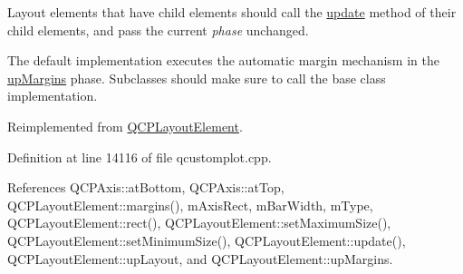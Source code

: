 Layout elements that have child elements should call the \hyperlink{class_q_c_p_color_scale_ab8f6991ac88243fc582b44b183670334}{update} method of their child elements, and pass the current {\itshape phase} unchanged.

The default implementation executes the automatic margin mechanism in the \hyperlink{class_q_c_p_layout_element_a0d83360e05735735aaf6d7983c56374da288cb59a92280e47261a341f2813e676}{up\+Margins} phase. Subclasses should make sure to call the base class implementation. 

Reimplemented from \hyperlink{class_q_c_p_layout_element_a929c2ec62e0e0e1d8418eaa802e2af9b}{Q\+C\+P\+Layout\+Element}.



Definition at line 14116 of file qcustomplot.\+cpp.



References Q\+C\+P\+Axis\+::at\+Bottom, Q\+C\+P\+Axis\+::at\+Top, Q\+C\+P\+Layout\+Element\+::margins(), m\+Axis\+Rect, m\+Bar\+Width, m\+Type, Q\+C\+P\+Layout\+Element\+::rect(), Q\+C\+P\+Layout\+Element\+::set\+Maximum\+Size(), Q\+C\+P\+Layout\+Element\+::set\+Minimum\+Size(), Q\+C\+P\+Layout\+Element\+::update(), Q\+C\+P\+Layout\+Element\+::up\+Layout, and Q\+C\+P\+Layout\+Element\+::up\+Margins.


